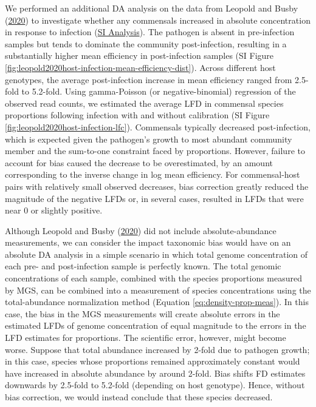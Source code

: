 \documentclass[
]{article}
\begin{document}
We performed an additional DA analysis on the data from Leopold and Busby (\protect\hyperlink{ref-leopold2020host}{2020}) to investigate whether any commensals increased in absolute concentration in response to infection (\href{https://mikemc.github.io/differential-abundance-theory/notebook/posts/2022-01-08-leopold2020host-case-study/\#change-in-commensals-due-to-infection}{SI Analysis}).
The pathogen is absent in pre-infection samples but tends to dominate the community post-infection, resulting in a substantially higher mean efficiency in post-infection samples (SI Figure \ref{fig:leopold2020host-infection-mean-efficiency-dist}).
Across different host genotypes, the average post-infection increase in mean efficiency ranged from 2.5-fold to 5.2-fold.
Using gamma-Poisson (or negative-binomial) regression of the observed read counts, we estimated the average LFD in commensal species proportions following infection with and without calibration (SI Figure \ref{fig:leopold2020host-infection-lfc}).
Commensals typically decreased post-infection, which is expected given the pathogen's growth to most abundant community member and the sum-to-one constraint faced by proportions.
However, failure to account for bias caused the decrease to be overestimated, by an amount corresponding to the inverse change in log mean efficiency.
For commensal-host pairs with relatively small observed decreases, bias correction greatly reduced the magnitude of the negative LFDs or, in several cases, resulted in LFDs that were near 0 or slightly positive.

Although Leopold and Busby (\protect\hyperlink{ref-leopold2020host}{2020}) did not include absolute-abundance measurements, we can consider the impact taxonomic bias would have on an absolute DA analysis in a simple scenario in which total genome concentration of each pre- and post-infection sample is perfectly known.
The total genomic concentrations of each sample, combined with the species proportions measured by MGS, can be combined into a measurement of species concentrations using the total-abundance normalization method (Equation \eqref{eq:density-prop-meas}).
In this case, the bias in the MGS measurements will create absolute errors in the estimated LFDs of genome concentration of equal magnitude to the errors in the LFD estimates for proportions.
The scientific error, however, might become worse.
Suppose that total abundance increased by 2-fold due to pathogen growth; in this case, species whose proportions remained approximately constant would have increased in absolute abundance by around 2-fold.
Bias shifts FD estimates downwards by 2.5-fold to 5.2-fold (depending on host genotype).
Hence, without bias correction, we would instead conclude that these species decreased.
\end{document}
